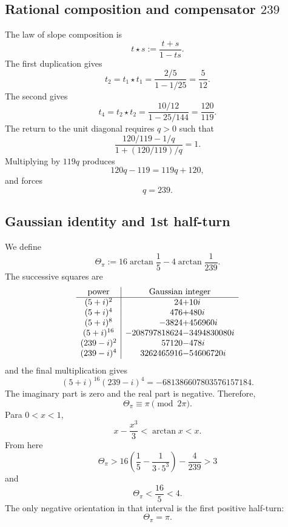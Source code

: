 \subsection{Rational composition and compensator \texorpdfstring{\(239\)}{239}}

The law of slope composition is
\[
 t\star s:=\frac{t+s}{1-ts}.
\]
The first duplication gives
\[
 t_2=t_1\star t_1
 =\frac{2/5}{1-1/25}
 =\frac5{12}.
\]
The second gives
\[
 t_4=t_2\star t_2
 =\frac{10/12}{1-25/144}
 =\frac{120}{119}.
\]
The return to the unit diagonal requires \(q>0\) such that
\[
 \frac{120/119-1/q}{1+(120/119)/q}=1.
\]
Multiplying by \(119q\) produces
\[
 120q-119=119q+120,
\]
and forces
\begin{equation}
 \boxed{q=239.}
 \label{p12-83-c8-s1:eq:compensador-239-pi}
\end{equation}

\subsection{Gaussian identity and 1st half-turn}

We define
\begin{equation}
 \Theta_\pi
 :=16\arctan\frac15-4\arctan\frac1{239}.
 \label{p12-83-c8-s1:eq:theta-pi-autonoma}
\end{equation}
The successive squares are
\[
\begin{array}{c|r@{}l}
\text{power}&\multicolumn{2}{c}{\text{Gaussian integer}}\\ \hline
(5+i)^2&24&+10i\\
(5+i)^4&476&+480i\\
(5+i)^8&-3824&+456960i\\
(5+i)^{16}&-208797818624&-3494830080i\\
(239-i)^2&57120&-478i\\
(239-i)^4&3262465916&-54606720i
\end{array}
\]
and the final multiplication gives
\begin{equation}
 \boxed{
 (5+i)^{16}(239-i)^4
 =-681386607803576157184.}
 \label{p12-83-c8-s1:eq:identidad-gaussiana-pi-autonoma}
\end{equation}
The imaginary part is zero and the real part is negative. Therefore,
\[
 \Theta_\pi\equiv\pi\pmod{2\pi}.
\]
Para \(0<x<1\),
\[
 x-\frac{x^3}{3}<\arctan x<x.
\]
From here
\[
 \Theta_\pi>
 16\left(\frac15-\frac1{3\cdot5^3}\right)-\frac4{239}>3
\]
and
\[
 \Theta_\pi<\frac{16}{5}<4.
\]
The only negative orientation in that interval is the first positive half-turn:
\begin{equation}
 \boxed{\Theta_\pi=\pi.}
 \label{p12-83-c8-s1:eq:reconocimiento-pi-exacto}
\end{equation}

